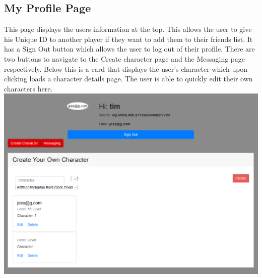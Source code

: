 \subsection{My Profile Page}
This page displays the users information at the top. This allows the user to give his Unique ID to another player if they want to add them to their friends list. It has a Sign Out button which allows the user to log out of their profile. There are two buttons to navigate to the Create character page and the Messaging page respectively. Below this is a card that displays the user's character which upon clicking loads a character details page. The user is able to quickly edit their own characters here.\\

\includegraphics[scale=0.3]{./img/Profile.png} \\
